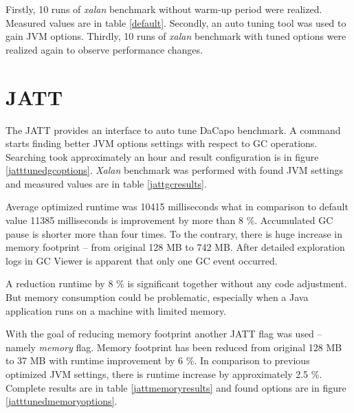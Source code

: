 \documentclass[
  digital, %
  oneside,
  notable, %
  nolof,     %
  nolot     %
]{fithesis3}
\begin{document}
Firstly, 10 runs of \textit{xalan} benchmark without warm-up period were realized. Measured values are in table \ref{default}. Secondly, an auto tuning tool was used to gain JVM options. Thirdly, 10 runs of \textit{xalan} benchmark with tuned options were realized again to observe performance changes.

\section{JATT}
The JATT provides an interface to auto tune DaCapo benchmark. A command \texttt{} starts finding better JVM options settings with respect to GC operations. Searching took approximately an hour and result configuration is in figure \ref{jatttunedgcoptions}. \textit{Xalan} benchmark was performed with found JVM settings and measured values are in table \ref{jattgcresults}.

Average optimized runtime was 10415 milliseconds what in comparison to default value 11385 milliseconds is improvement by more than 8 \%. Accumulated GC pause is shorter more than four times. To the contrary, there is huge increase in memory footprint -- from original 128 MB to 742 MB. After detailed exploration logs in GC Viewer is apparent that only one GC event occurred.

A reduction runtime by 8 \% is significant together without any code adjustment. But memory consumption could be problematic, especially when a Java application runs on a machine with limited memory.

With the goal of reducing memory footprint another JATT flag was used -- namely \textit{memory} flag. Memory footprint has been reduced from original 128 MB to 37 MB with runtime improvement by 6 \%. In comparison to previous optimized JVM settings, there is runtime increase by approximately 2.5 \%.  Complete results are in table \ref{jattmemoryresults} and found options are in figure \ref{jatttunedmemoryoptions}.
\end{document}
